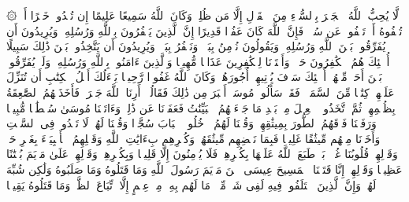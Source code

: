 ۞ لَّا یُحِبُّ ٱللَّهُ ٱلۡجَهۡرَ بِٱلسُّوۤءِ مِنَ ٱلۡقَوۡلِ إِلَّا مَن ظُلِمَۚ وَكَانَ ٱللَّهُ سَمِیعًا عَلِیمًا%
\stopbuffer
\startbuffer[\q:4:149]
إِن تُبۡدُوا۟ خَیۡرًا أَوۡ تُخۡفُوهُ أَوۡ تَعۡفُوا۟ عَن سُوۤءࣲ فَإِنَّ ٱللَّهَ كَانَ عَفُوࣰّا قَدِیرًا%
\stopbuffer
\startbuffer[\q:4:150]
إِنَّ ٱلَّذِینَ یَكۡفُرُونَ بِٱللَّهِ وَرُسُلِهِۦ وَیُرِیدُونَ أَن یُفَرِّقُوا۟ بَیۡنَ ٱللَّهِ وَرُسُلِهِۦ وَیَقُولُونَ نُؤۡمِنُ بِبَعۡضࣲ وَنَكۡفُرُ بِبَعۡضࣲ وَیُرِیدُونَ أَن یَتَّخِذُوا۟ بَیۡنَ ذَٰلِكَ سَبِیلًا%
\stopbuffer
\startbuffer[\q:4:151]
أُو۟لَٰۤئِكَ هُمُ ٱلۡكَٰفِرُونَ حَقࣰّاۚ وَأَعۡتَدۡنَا لِلۡكَٰفِرِینَ عَذَابࣰا مُّهِینࣰا%
\stopbuffer
\startbuffer[\q:4:152]
وَٱلَّذِینَ ءَامَنُوا۟ بِٱللَّهِ وَرُسُلِهِۦ وَلَمۡ یُفَرِّقُوا۟ بَیۡنَ أَحَدࣲ مِّنۡهُمۡ أُو۟لَٰۤئِكَ سَوۡفَ یُؤۡتِیهِمۡ أُجُورَهُمۡۚ وَكَانَ ٱللَّهُ غَفُورࣰا رَّحِیمࣰا%
\stopbuffer
\startbuffer[\q:4:153]
یَسۡءَلُكَ أَهۡلُ ٱلۡكِتَٰبِ أَن تُنَزِّلَ عَلَیۡهِمۡ كِتَٰبࣰا مِّنَ ٱلسَّمَاۤءِۚ فَقَدۡ سَأَلُوا۟ مُوسَىٰۤ أَكۡبَرَ مِن ذَٰلِكَ فَقَالُوۤا۟ أَرِنَا ٱللَّهَ جَهۡرَةࣰ فَأَخَذَتۡهُمُ ٱلصَّٰعِقَةُ بِظُلۡمِهِمۡۚ ثُمَّ ٱتَّخَذُوا۟ ٱلۡعِجۡلَ مِنۢ بَعۡدِ مَا جَاۤءَتۡهُمُ ٱلۡبَیِّنَٰتُ فَعَفَوۡنَا عَن ذَٰلِكَۚ وَءَاتَیۡنَا مُوسَىٰ سُلۡطَٰنࣰا مُّبِینࣰا%
\stopbuffer
\startbuffer[\q:4:154]
وَرَفَعۡنَا فَوۡقَهُمُ ٱلطُّورَ بِمِیثَٰقِهِمۡ وَقُلۡنَا لَهُمُ ٱدۡخُلُوا۟ ٱلۡبَابَ سُجَّدࣰا وَقُلۡنَا لَهُمۡ لَا تَعۡدُوا۟ فِی ٱلسَّبۡتِ وَأَخَذۡنَا مِنۡهُم مِّیثَٰقًا غَلِیظࣰا%
\stopbuffer
\startbuffer[\q:4:155]
فَبِمَا نَقۡضِهِم مِّیثَٰقَهُمۡ وَكُفۡرِهِم بِءَایَٰتِ ٱللَّهِ وَقَتۡلِهِمُ ٱلۡأَنۢبِیَاۤءَ بِغَیۡرِ حَقࣲّ وَقَوۡلِهِمۡ قُلُوبُنَا غُلۡفُۢۚ بَلۡ طَبَعَ ٱللَّهُ عَلَیۡهَا بِكُفۡرِهِمۡ فَلَا یُؤۡمِنُونَ إِلَّا قَلِیلࣰا%
\stopbuffer
\startbuffer[\q:4:156]
وَبِكُفۡرِهِمۡ وَقَوۡلِهِمۡ عَلَىٰ مَرۡیَمَ بُهۡتَٰنًا عَظِیمࣰا%
\stopbuffer
\startbuffer[\q:4:157]
وَقَوۡلِهِمۡ إِنَّا قَتَلۡنَا ٱلۡمَسِیحَ عِیسَى ٱبۡنَ مَرۡیَمَ رَسُولَ ٱللَّهِ وَمَا قَتَلُوهُ وَمَا صَلَبُوهُ وَلَٰكِن شُبِّهَ لَهُمۡۚ وَإِنَّ ٱلَّذِینَ ٱخۡتَلَفُوا۟ فِیهِ لَفِی شَكࣲّ مِّنۡهُۚ مَا لَهُم بِهِۦ مِنۡ عِلۡمٍ إِلَّا ٱتِّبَاعَ ٱلظَّنِّۚ وَمَا قَتَلُوهُ یَقِینَۢا%
\stopbuffer
